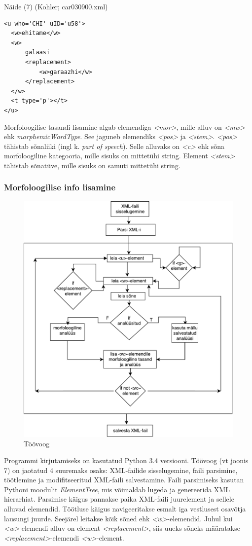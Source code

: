 \documentclass[12pt]{article}
\begin{document}
\hfill

Näide (7) (Kohler; car030900.xml)
\begin{lstlisting}
<u who='CHI' uID='u58'>
  <w>ehitame</w>
  <w>
      galaasi
      <replacement>
          <w>garaazhi</w>
      </replacement>
  </w>
  <t type='p'></t>
</u>
\end{lstlisting}

Morfoloogilise tasandi lisamine algab elemendiga \emph{<mor>}, mille alluv on \emph{<mw>} ehk \emph{morphemicWordType}. See jaguneb elemendiks \emph{<pos>} ja \emph{<stem>}. \emph{<pos>} tähistab sõnaliiki (ingl k. \emph{part of speech}). Selle alluvaks on \emph{<c>} ehk sõna morfoloogiline kategooria, mille sisuks on mittetühi string. Element \emph{<stem>} tähistab sõnatüve, mille sisuks on samuti mittetühi string.

\subsubsection{Morfoloogilise info lisamine}

\begin{figure}[H]
    \centering
    \includegraphics[width=12cm]{toovoog}
    \caption{Töövoog}
\end{figure}


Programmi kirjutamiseks on kasutatud Python 3.4 versiooni. Töövoog (vt joonis 7) on jaotatud 4 suuremaks osaks: XML-failide sisselugemine, faili parsimine, töötlemine ja modifitseeritud XML-faili salvestamine. Faili parsimiseks kasutan Pythoni moodulit \emph{ElementTree}, mis võimaldab lugeda ja genereerida XML hierarhiat. Parsimise käigus pannakse paika XML-faili juurelement ja sellele alluvad elemendid. Töötluse käigus navigeeritakse esmalt iga vestlusest osavõtja lausungi juurde. Seejärel leitakse kõik sõned ehk \emph{<w>}-elemendid. Juhul kui \emph{<w>}-elemendi alluv on element \emph{<replacement>}, siis uueks sõneks määratakse \emph{<replacement>}-elemendi \emph{<w>}-element.
\end{document}
